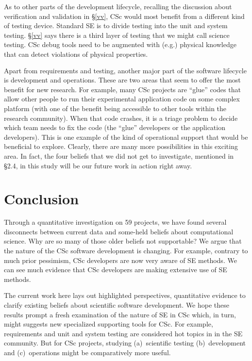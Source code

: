 \documentclass[conference,10pt]{IEEEtran}
\begin{document}
As to other parts of the development lifecycle,  recalling the discussion about verification and validation in \S\ref{vv}, CSc would most benefit from a different kind of testing device. Standard SE is to divide testing into the unit and system testing. \S\ref{vv} says there is a third layer of testing that we might call science testing. CSc debug tools need to be augmented with (e.g.)  physical knowledge that can detect violations of physical properties.

Apart from requirements and testing, another major part of the software lifecycle is development and operations. These are two areas that seem to offer the most benefit for new research. For example, many CSc projects are ``glue'' codes that allow other people to run their experimental application code on some complex platform (with one of the benefit being accessible to other tools within the research community). When that code crashes, it is a triage problem to decide which team needs to fix the code (the ``glue'' developers or the application developers). This is one example of the kind of operational support that would be beneficial to explore. Clearly, there are many more possibilities in this exciting area. In fact, the four beliefs that we did not get to investigate, mentioned in \S2.4, in this study will be our future work in action right away. 




\section{Conclusion}

Through a quantitative investigation on 59 projects, we have found several disconnects between current data
and some-held beliefs about computational science.
Why are so many of those older beliefs not supportable?
We argue that  the  nature of the CSc software development is changing. 
For example, contrary to much prior pessimism,
CSc developers are now very
aware of SE methods. 
We can see much evidence that CSc developers are making
extensive use of SE methods.

 
 The current work here lays out highlighted perspectives, quantitative evidence to clarify existing beliefs about scientific software development.
 We hope these results  prompt a fresh examination of the nature of SE in  CSc which, in turn, might suggests 
  new   specialized supporting tools for CSc.
For example, requirements and unit and system testing  are considered hot topics in in the SE community.
But for CSc projects,   studying  (a)~scientific testing (b)~development and
(c)~operations might be comparatively more useful.
\end{document}
